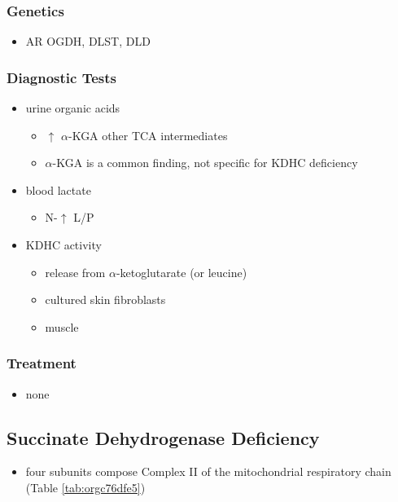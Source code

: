 \documentclass[12pt]{scrartcl}
\begin{document}
\subsubsection{Genetics}
\label{sec:org5556e26}
\begin{itemize}
\item AR OGDH, DLST, DLD
\end{itemize}

\subsubsection{Diagnostic Tests}
\label{sec:org832e780}
\begin{itemize}
\item urine organic acids
\begin{itemize}
\item \(\uparrow\) \(\alpha\)-KGA \textpm{} other TCA intermediates
\item \(\alpha\)-KGA is a common finding, not specific for KDHC deficiency
\end{itemize}
\item blood lactate
\begin{itemize}
\item N-\(\uparrow\) L/P
\end{itemize}
\item KDHC activity
\begin{itemize}
\item {} release from \ce{[1-^14C]} \(\alpha\)-ketoglutarate (or \ce{[1-^14C]} leucine)
\item cultured skin fibroblasts
\item muscle
\end{itemize}
\end{itemize}

\subsubsection{Treatment}
\label{sec:orga977385}
\begin{itemize}
\item none
\end{itemize}
\subsection{Succinate Dehydrogenase Deficiency}
\label{sec:orga397a47}
\begin{itemize}
\item four subunits compose Complex II of the mitochondrial respiratory
chain (Table \ref{tab:orgc76dfe5})
\end{itemize}
\end{document}
